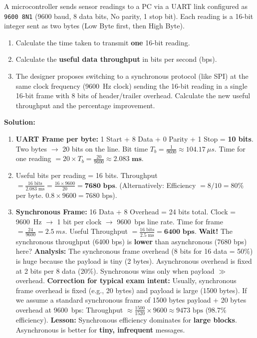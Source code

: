 \documentclass[11pt]{article}
\begin{document}
\begin{exoresolu}
A microcontroller sends sensor readings to a PC via a UART link configured as \texttt{9600 8N1} (9600 baud, 8 data bits, No parity, 1 stop bit). Each reading is a 16-bit integer sent as two bytes (Low Byte first, then High Byte).
\begin{enumerate}
    \item Calculate the time taken to transmit \textbf{one} 16-bit reading.
    \item Calculate the \textbf{useful data throughput} in bits per second (bps).
    \item The designer proposes switching to a synchronous protocol (like SPI) at the same clock frequency (\SI{9600}{Hz} clock) sending the 16-bit reading in a single 16-bit frame with 8 bits of header/trailer overhead. Calculate the new useful throughput and the percentage improvement.
\end{enumerate}
\tcblower
\textbf{Solution:}
\begin{enumerate}
    \item \textbf{UART Frame per byte:} 1 Start + 8 Data + 0 Parity + 1 Stop = \textbf{10 bits}.
        Two bytes $\rightarrow$ 20 bits on the line.
        Bit time $T_b = \frac{1}{9600} \approx \SI{104.17}{\mu s}$.
        Time for one reading $= 20 \times T_b = \frac{20}{9600} \approx \mathbf{2.083 \text{ ms}}$.
    \item Useful bits per reading = 16 bits.
        Throughput $= \frac{16 \text{ bits}}{2.083 \text{ ms}} = \frac{16 \times 9600}{20} = \mathbf{7680 \text{ bps}}$.
        (Alternatively: Efficiency $= 8/10 = 80\%$ per byte. $0.8 \times 9600 = 7680 \text{ bps}$).
    \item \textbf{Synchronous Frame:} 16 Data + 8 Overhead = 24 bits total.
        Clock = \SI{9600}{Hz} $\rightarrow$ 1 bit per clock $\rightarrow$ \SI{9600}{bps} line rate.
        Time for frame $= \frac{24}{9600} = \SI{2.5}{ms}$.
        Useful Throughput $= \frac{16 \text{ bits}}{2.5 \text{ ms}} = \mathbf{6400 \text{ bps}}$.
        \textbf{Wait!} The synchronous throughput (6400 bps) is \textbf{lower} than asynchronous (7680 bps) here?
        \textbf{Analysis:} The synchronous frame overhead (8 bits for 16 data = 50\%) is huge because the payload is tiny (2 bytes). Asynchronous overhead is fixed at 2 bits per 8 data (20\%). Synchronous wins only when payload $\gg$ overhead.
        \textbf{Correction for typical exam intent:} Usually, synchronous frame overhead is fixed (e.g., 20 bytes) and payload is large (1500 bytes). If we assume a standard synchronous frame of 1500 bytes payload + 20 bytes overhead at \SI{9600}{bps}:
        Throughput $\approx \frac{1500}{1520} \times 9600 \approx 9473 \text{ bps}$ (98.7\% efficiency).
        \textbf{Lesson:} Synchronous efficiency dominates for \textbf{large blocks}. Asynchronous is better for \textbf{tiny, infrequent} messages.
\end{enumerate}
\end{exoresolu}
\end{document}
